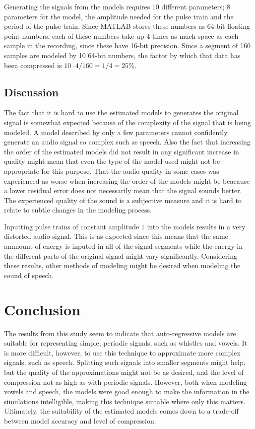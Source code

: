 \documentclass{IEEEtran}
\begin{document}
Generating the signals from the models requires 10 different parameters;
8 parameters for the model, the amplitude needed for the pulse train and
the period of the pulse train. Since MATLAB stores these numbers as 64-bit
floating point numbers, each of these numbers take up 4 times as much space
as each sample in the recording, since these have 16-bit precision.
Since a segment of 160 samples are modeled by 10 64-bit numbers, the 
factor by which that data has been
compressed is $10\cdot4/160 = 1/4 = 25\%$.


\subsection{Discussion}
The fact that it is hard to use the estimated models to generates the
original signal is somewhat expected because of the complexity of the
signal that is being modeled. A model described by only a few parameters
cannot confidently generate an audio signal so complex such as speech.
Also the fact that increasing the order of the estimated models did not
result in any significant increase in quality might mean that even the
type of the model used might not be appropriate for this purpose. That
the audio quality in some cases was experienced as worse when increasing
the order of the models might be beacause a lower residual error does
not necessarily mean that the signal sounds better. The experienced
quality of the sound is a subjective measure and it is hard to relate
to subtle changes in the modeling process.

Inputting pulse trains of constant amplitude $1$ into the models results
in a very distorted audio signal. This is as expected since this means
that the same ammount of energy is inputed in all of the signal segments
while the energy in the different parts of the original signal might vary
significantly. Considering these results, other methods of modeling might
be desired when modeling the sound of speech.

\section{Conclusion}

The results from this study seem to indicate that auto-regressive models are
suitable for representing simple, periodic signals, such as whistles and
vowels. It is more difficult, however, to use this technique to approximate
more complex signals, such as speech. Splitting such signals into smaller
segments might help, but the quality of the approximations might not be as
desired, and the level of compression not as high as with periodic signals.
However, both when modeling vowels and speech, the models were good enough to
make the information in the simulations intelligible, making this technique
suitable where only this matters. Ultimately, the suitability of the estimated
models comes down to a trade-off between model accuracy and level of
compression.
\end{document}
